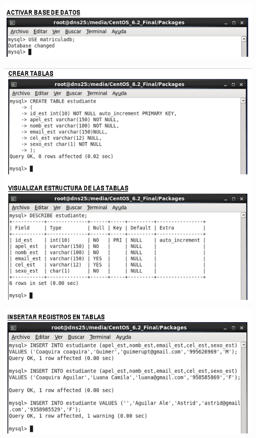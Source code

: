 \begin{itemize}
	\begin{center}
		\includegraphics[width=13cm]{./Imagenes/13a}
		\end{center}
\end{itemize} 

\begin{itemize}
	\begin{center}
		\includegraphics[width=13cm]{./Imagenes/14a}
		\end{center}
\end{itemize} 

\begin{itemize}
	\begin{center}
		\includegraphics[width=13cm]{./Imagenes/15a}
		\end{center}
\end{itemize} 

